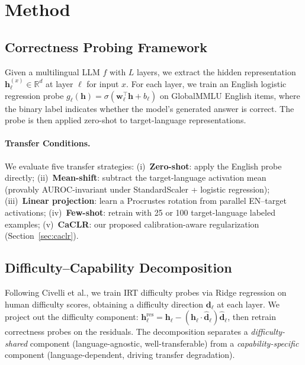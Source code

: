 \documentclass[11pt,a4paper]{article}
\newcommand{\caclr}{CaCLR}
\begin{document}
\section{Method}

\subsection{Correctness Probing Framework}

Given a multilingual LLM $f$ with $L$ layers, we extract the hidden representation $\mathbf{h}_\ell^{(x)} \in \mathbb{R}^d$ at layer $\ell$ for input $x$.
For each layer, we train an English logistic regression probe $g_\ell(\mathbf{h}) = \sigma(\mathbf{w}_\ell^\top \mathbf{h} + b_\ell)$ on GlobalMMLU English items, where the binary label indicates whether the model's generated answer is correct.
The probe is then applied zero-shot to target-language representations.

\paragraph{Transfer Conditions.}
We evaluate five transfer strategies:
(i)~\textbf{Zero-shot}: apply the English probe directly;
(ii)~\textbf{Mean-shift}: subtract the target-language activation mean (provably AUROC-invariant under StandardScaler + logistic regression);
(iii)~\textbf{Linear projection}: learn a Procrustes rotation from parallel EN--target activations;
(iv)~\textbf{Few-shot}: retrain with 25 or 100 target-language labeled examples;
(v)~\textbf{\caclr{}}: our proposed calibration-aware regularization (Section~\ref{sec:caclr}).

\subsection{Difficulty--Capability Decomposition}
\label{sec:decomposition}

Following Civelli et al., we train IRT difficulty probes via Ridge regression on human difficulty scores, obtaining a difficulty direction $\mathbf{d}_\ell$ at each layer.
We project out the difficulty component: $\mathbf{h}_\ell^{\text{res}} = \mathbf{h}_\ell - (\mathbf{h}_\ell \cdot \hat{\mathbf{d}}_\ell)\hat{\mathbf{d}}_\ell$, then retrain correctness probes on the residuals.
The decomposition separates a \emph{difficulty-shared} component (language-agnostic, well-transferable) from a \emph{capability-specific} component (language-dependent, driving transfer degradation).
\end{document}
